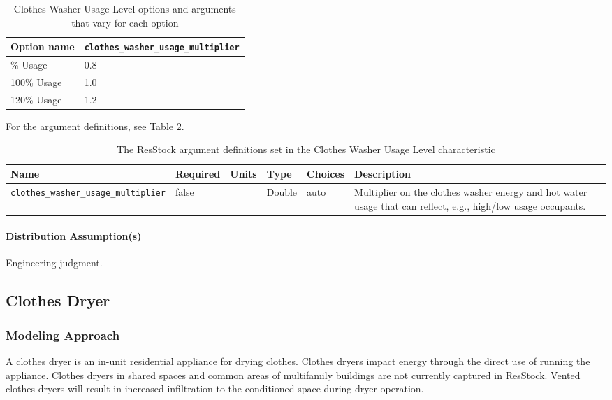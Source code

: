 \begin{longtable}[]{ |p{2.5cm}|p{6cm}| }
\caption{Clothes Washer Usage Level options and arguments that vary for each option} \label{table:opt_def_clothes_washer_use} \\
\toprule\noalign{}
Option name &
\texttt{clothes\_washer\_usage\_multiplier} \\
\midrule\noalign{}
\endhead
\bottomrule\noalign{}
\endlastfoot
80\% Usage & 0.8 \\
100\% Usage & 1.0 \\
120\% Usage & 1.2 \\
\end{longtable}

For the argument definitions, see Table \ref{table:hc_arg_def_clothes_washer_usage_level}. 

\begin{longtable}[]{ |p{}|p{1.5cm}|p{1cm}|p{1.1cm}|p{3.4cm}|p{4cm}| }
\caption{The ResStock argument definitions set in the Clothes Washer Usage Level characteristic} \label{table:hc_arg_def_clothes_washer_usage_level}\\
\toprule\noalign{}
Name & Required & Units & Type & Choices & Description \\
\midrule\noalign{}
\endhead
\bottomrule\noalign{}
\endlastfoot
\texttt{clothes\_washer\_usage\_multiplier} & false & & Double & auto &
Multiplier on the clothes washer energy and hot water usage that can
reflect, e.g., high/low usage occupants.  \\
\end{longtable}
\paragraph{Distribution Assumption(s)}
Engineering judgment.


\subsection{Clothes Dryer}
\subsubsection{Modeling Approach}
A clothes dryer is an in-unit residential appliance for drying clothes. Clothes dryers impact energy through the direct use of running the appliance. Clothes dryers in shared spaces and common areas of multifamily buildings are not currently captured in ResStock. Vented clothes dryers will result in increased infiltration to the conditioned space during dryer operation.

